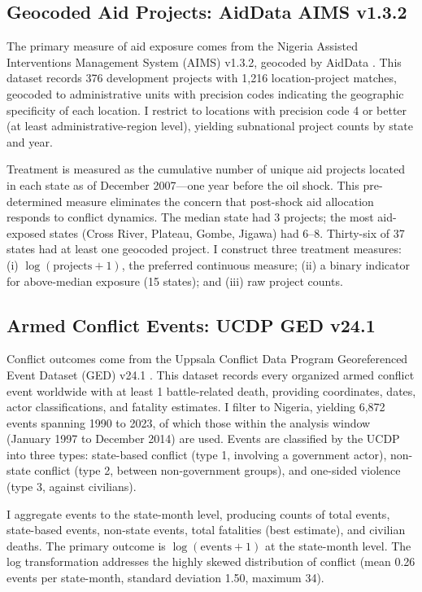 \documentclass[12pt]{article}
\begin{document}
\subsection{Geocoded Aid Projects: AidData AIMS v1.3.2}

The primary measure of aid exposure comes from the Nigeria Assisted Interventions Management System (AIMS) v1.3.2, geocoded by AidData \citep{tierney2011more, strandow2011taking}. This dataset records 376 development projects with 1,216 location-project matches, geocoded to administrative units with precision codes indicating the geographic specificity of each location. I restrict to locations with precision code 4 or better (at least administrative-region level), yielding subnational project counts by state and year.

Treatment is measured as the cumulative number of unique aid projects located in each state as of December 2007---one year before the oil shock. This pre-determined measure eliminates the concern that post-shock aid allocation responds to conflict dynamics. The median state had 3 projects; the most aid-exposed states (Cross River, Plateau, Gombe, Jigawa) had 6--8. Thirty-six of 37 states had at least one geocoded project. I construct three treatment measures: (i) $\log(\text{projects} + 1)$, the preferred continuous measure; (ii) a binary indicator for above-median exposure (15 states); and (iii) raw project counts.

\subsection{Armed Conflict Events: UCDP GED v24.1}

Conflict outcomes come from the Uppsala Conflict Data Program Georeferenced Event Dataset (GED) v24.1 \citep{sundberg2013introducing}. This dataset records every organized armed conflict event worldwide with at least 1 battle-related death, providing coordinates, dates, actor classifications, and fatality estimates. I filter to Nigeria, yielding 6,872 events spanning 1990 to 2023, of which those within the analysis window (January 1997 to December 2014) are used. Events are classified by the UCDP into three types: state-based conflict (type 1, involving a government actor), non-state conflict (type 2, between non-government groups), and one-sided violence (type 3, against civilians).

I aggregate events to the state-month level, producing counts of total events, state-based events, non-state events, total fatalities (best estimate), and civilian deaths. The primary outcome is $\log(\text{events} + 1)$ at the state-month level. The log transformation addresses the highly skewed distribution of conflict (mean 0.26 events per state-month, standard deviation 1.50, maximum 34).
\end{document}
